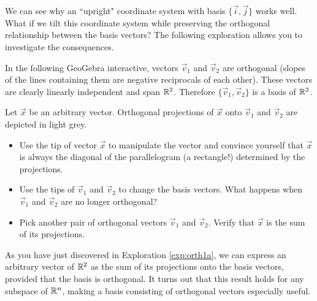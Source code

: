 \documentclass{ximera}
\begin{document}
We can see why an ``upright" coordinate system with basis $\{\vec{i},\vec{j}\}$ works well.  What if we tilt this coordinate system while preserving the orthogonal relationship between the basis vectors?  The following exploration allows you to investigate the consequences.

\begin{exploration}\label{exp:orth1a}
    In the following GeoGebra interactive, vectors $\vec{v}_1$ and $\vec{v}_2$ are orthogonal (slopes of the lines containing them are negative reciprocals of each other).  These vectors are clearly linearly independent and span $\mathbb{R}^2$.  Therefore $\{\vec{v}_1,\vec{v}_2\}$ is a basis of $\mathbb{R}^2$.  
    
    Let $\vec{x}$ be an arbitrary vector.  Orthogonal projections of $\vec{x}$ onto $\vec{v}_1$ and $\vec{v}_2$ are depicted in light grey.
    \begin{itemize}
           \item Use the tip of vector $\vec{x}$ to manipulate the vector and convince yourself that $\vec{x}$ is always the diagonal of the parallelogram (a rectangle!) determined by the projections.
        \item Use the tips of $\vec{v}_1$ and $\vec{v}_2$ to change the basis vectors.  What happens when $\vec{v}_1$ and $\vec{v}_2$ are no longer orthogonal?
        \item Pick another pair of orthogonal vectors $\vec{v}_1$ and $\vec{v}_2$.  Verify that $\vec{x}$ is the sum of its projections.
    \end{itemize}


\begin{onlineOnly}
    \begin{center}
\end{center}
\end{onlineOnly}
\end{exploration}


As you have just discovered in Exploration \ref{exp:orth1a}, we can express an arbitrary vector of $\mathbb{R}^2$ as the sum of its projections onto the basis vectors, provided that the basis is orthogonal. It turns out that this result holds for any subspace of $\mathbb{R}^n$, making a basis consisting of orthogonal vectors especially useful. 
\end{document}
